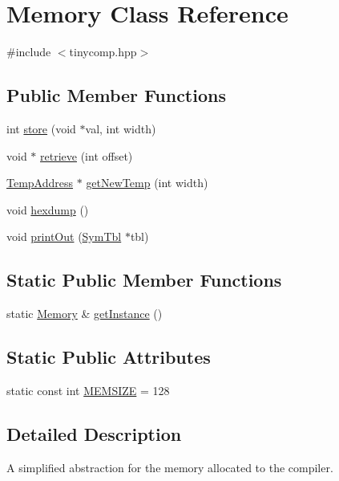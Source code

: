 \hypertarget{class_memory}{}\section{Memory Class Reference}
\label{class_memory}


{\ttfamily \#include $<$tinycomp.\+hpp$>$}

\subsection*{Public Member Functions}
\begin{DoxyCompactItemize}
\item 
int \hyperlink{class_memory_ab07133625f6fc3ef7e094768896ed2fb}{store} (void $\ast$val, int width)
\item 
void $\ast$ \hyperlink{class_memory_afbe4f8f6d315e8663a164eb2c44b2def}{retrieve} (int offset)
\item 
\hyperlink{class_temp_address}{Temp\+Address} $\ast$ \hyperlink{class_memory_ad04d1a36f88c219d7447c10c098e4530}{get\+New\+Temp} (int width)
\item 
void \hyperlink{class_memory_a49ce489fcc012c09284dcc8c1bc4d52b}{hexdump} ()
\item 
void \hyperlink{class_memory_a2f0418e16871271c242acf67894ffa1c}{print\+Out} (\hyperlink{class_sym_tbl}{Sym\+Tbl} $\ast$tbl)
\end{DoxyCompactItemize}
\subsection*{Static Public Member Functions}
\begin{DoxyCompactItemize}
\item 
static \hyperlink{class_memory}{Memory} \& \hyperlink{class_memory_a96eac3970b3baba973645a9cc32aee4c}{get\+Instance} ()
\end{DoxyCompactItemize}
\subsection*{Static Public Attributes}
\begin{DoxyCompactItemize}
\item 
static const int \hyperlink{class_memory_a1f45f0eb9259f5c73cdbb1190212315f}{M\+E\+M\+S\+I\+ZE} = 128
\end{DoxyCompactItemize}


\subsection{Detailed Description}
A simplified abstraction for the memory allocated to the compiler. 

